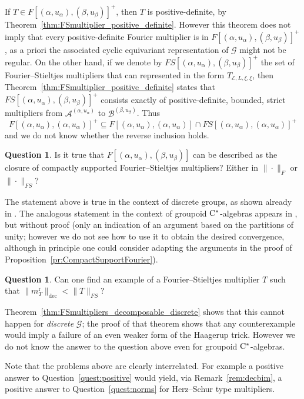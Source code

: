 \documentclass[11 pt, leqno]{amsart}
\numberwithin{equation}{section}
\theoremstyle{plain}
\theoremstyle{definition}
\newtheorem {quest} [thm]{Question}
\DeclareMathOperator{\rd}{r}%
\newcommand{\B}{\mathcal B}
\newcommand{\m}{m}
\newcommand{\G}{\mathcal G} %
\newcommand{\EE}{\mathcal E}
\newcommand{\A}{\mathcal A}
\newcommand{\cst}{\ifmmode\mathrm{C}^*\else{$\mathrm{C}^*$}\fi}
\begin{document}
If $T\in F[(\alpha,u_{\alpha}),(\beta,u_{\beta})]^+$, then $T$ is positive-definite, by Theorem~\ref{thm:FSmultiplier_positive_definite}. 
However this theorem does not imply that every positive-definite Fourier multiplier is in $F[(\alpha,u_{\alpha}),(\beta,u_{\beta})]^+$, as a priori the associated cyclic equivariant representation of $\G$ might not be regular. 
On the other hand, if we denote by $FS[(\alpha,u_{\alpha}),(\beta,u_{\beta})]^+$ the set of Fourier--Stieltjes multipliers that can represented in the form $T_{\EE,L,\xi,\xi}$, then Theorem~\ref{thm:FSmultiplier_positive_definite} states that $FS[(\alpha,u_{\alpha}),(\beta,u_{\beta})]^+$ consists exactly of positive-definite, bounded, strict multipliers from $\A^{(\alpha,u_{\alpha})}$ to $\B^{(\beta,u_{\beta})}$. 
Thus 
\[
    F[(\alpha,u_{\alpha}),(\alpha, u_\alpha)]^+\subseteq  F[(\alpha,u_{\alpha}),(\alpha, u_\alpha)] \cap FS[(\alpha,u_{\alpha}),(\alpha, u_\alpha)]^+ 
\]
and we do not know whether the reverse inclusion holds.


\begin{quest} \label{quest:compact}
Is it true that  $ F[(\alpha,u_{\alpha}),(\beta, u_\beta)]$ can be described as the closure of compactly supported Fourier--Stieltjes multipliers? 
Either in $\|\cdot\|_F$ or $\|\cdot\|_{FS}$? 
\end{quest}

The statement above is true in the context of discrete groups, as shown already in \cite{Eymard}. 
The analogous statement in the context of groupoid $\cst$-algebras appears in \cite{Renault}, but without proof (only an indication of an argument based on the partitions of unity; however we do not see how to use it to obtain the desired convergence, although in principle one could consider adapting the arguments in the proof of Proposition~\ref{pr:CompactSupportFourier}).


\begin{quest} \label{quest:dec}
Can one find an example of a Fourier--Stieltjes multiplier $T$ such that $\|\m_T^{\rd}\|_{\mathrm{dec}} < \|T\|_{FS}$?
\end{quest}

Theorem~\ref{thm:FSmultipliers_decomposable_discrete} shows that this cannot happen for \emph{discrete} $\G$; the proof of that theorem shows that any counterexample would imply a failure of an even weaker form of the Haagerup trick. 
However we do not know the answer to the question above even for groupoid $\cst$-algebras. 

Note that the problems above are clearly interrelated. 
For example a positive answer to Question~\ref{quest:positive} would yield, via Remark~\ref{rem:decbim}, a positive answer to Question~\ref{quest:norms} for Herz--Schur type multipliers.
\end{document}
